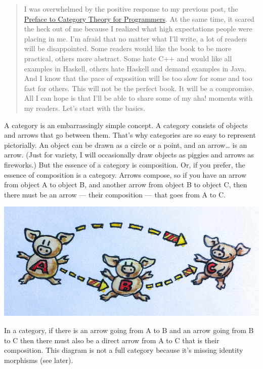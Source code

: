 \begin{quote}
I was overwhelmed by the positive response to my previous post, the
\href{https://bartoszmilewski.com/2014/10/28/category-theory-for-programmers-the-preface/}{Preface
to Category Theory for Programmers}. At the same time, it scared the
heck out of me because I realized what high expectations people were
placing in me. I'm afraid that no matter what I'll write, a lot of
readers will be disappointed. Some readers would like the book to be
more practical, others more abstract. Some hate C++ and would like all
examples in Haskell, others hate Haskell and demand examples in Java.
And I know that the pace of exposition will be too slow for some and too
fast for others. This will not be the perfect book. It will be a
compromise. All I can hope is that I'll be able to share some of my aha!
moments with my readers. Let's start with the basics.
\end{quote}

A category is an embarrassingly simple concept. A category consists of
objects and arrows that go between them. That's why categories are so
easy to represent pictorially. An object can be drawn as a circle or a
point, and an arrow\ldots{} is an arrow. (Just for variety, I will
occasionally draw objects as piggies and arrows as fireworks.) But the
essence of a category is composition. Or, if you prefer, the essence of
composition is a category. Arrows compose, so if you have an arrow from
object A to object B, and another arrow from object B to object C, then
there must be an arrow --- their composition --- that goes from A to C.

\hypertarget{attachment_3483}{}
\includegraphics[width=5.31250in]{images/img_1330.jpg}

In a category, if there is an arrow going from A to B and an arrow going
from B to C then there must also be a direct arrow from A to C that is
their composition. This diagram is not a full category because it's
missing identity morphisms (see later).

